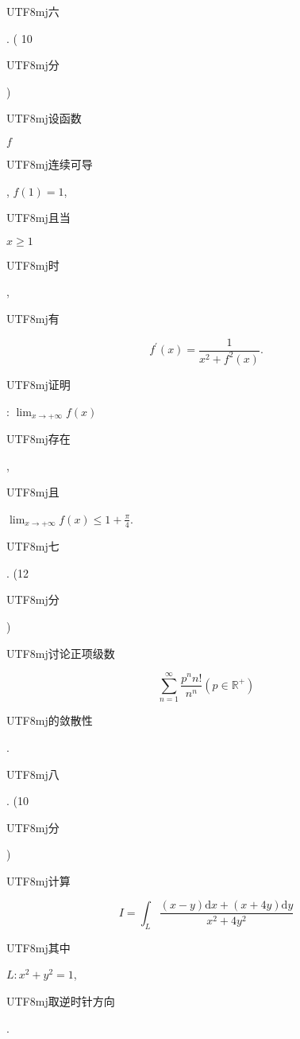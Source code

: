 \documentclass[10pt]{article}
\begin{document}
\begin{CJK}{UTF8}{mj}六\end{CJK}. ( 10 \begin{CJK}{UTF8}{mj}分\end{CJK}) \begin{CJK}{UTF8}{mj}设函数\end{CJK} $f$ \begin{CJK}{UTF8}{mj}连续可导\end{CJK}, $f(1)=1$, \begin{CJK}{UTF8}{mj}且当\end{CJK} $x \geqslant 1$ \begin{CJK}{UTF8}{mj}时\end{CJK}, \begin{CJK}{UTF8}{mj}有\end{CJK}
$$
f^{\prime}(x)=\frac{1}{x^{2}+f^{2}(x)} .
$$
\begin{CJK}{UTF8}{mj}证明\end{CJK}: $\lim _{x \rightarrow+\infty} f(x)$ \begin{CJK}{UTF8}{mj}存在\end{CJK}, \begin{CJK}{UTF8}{mj}且\end{CJK} $\lim _{x \rightarrow+\infty} f(x) \leqslant 1+\frac{\pi}{4}$.

\begin{CJK}{UTF8}{mj}七\end{CJK}. (12 \begin{CJK}{UTF8}{mj}分\end{CJK}) \begin{CJK}{UTF8}{mj}讨论正项级数\end{CJK}
$$
\sum_{n=1}^{\infty} \frac{p^{n} n !}{n^{n}}\left(p \in \mathbb{R}^{+}\right)
$$
\begin{CJK}{UTF8}{mj}的敛散性\end{CJK}. \begin{CJK}{UTF8}{mj}八\end{CJK}. (10 \begin{CJK}{UTF8}{mj}分\end{CJK}) \begin{CJK}{UTF8}{mj}计算\end{CJK}
$$
I=\int_{L} \frac{(x-y) \mathrm{d} x+(x+4 y) \mathrm{d} y}{x^{2}+4 y^{2}}
$$
\begin{CJK}{UTF8}{mj}其中\end{CJK} $L: x^{2}+y^{2}=1$, \begin{CJK}{UTF8}{mj}取逆时针方向\end{CJK}.
\end{document}
